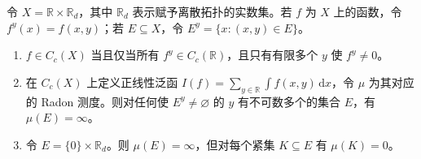 \documentclass[../../main.tex]{subfiles}
\begin{document}
\begin{exercise}\label{exercise:ch07-uncountable-lines}
令 $X=\mathbb R\times\mathbb R_d$，其中 $\mathbb R_d$ 表示赋予离散拓扑的实数集。若 $f$ 为 $X$ 上的函数，令 $f^y(x)=f(x,y)$；若 $E\subseteq X$，令 $E^y=\{x:(x,y)\in E\}$。
\begin{enumerate}[label=\alph*.,ref=(\alph*)]
\item\label{item:ch07-lines-cc} $f\in C_c(X)$ 当且仅当所有 $f^y\in C_c(\mathbb R)$，且只有有限多个 $y$ 使 $f^y\ne0$。
\item\label{item:ch07-lines-infinite-mass} 在 $C_c(X)$ 上定义正线性泛函 $I(f)=\sum_{y\in\mathbb R}\int f(x,y)\,\mathrm dx$，令 $\mu$ 为其对应的 Radon 测度。则对任何使 $E^y\ne\varnothing$ 的 $y$ 有不可数多个的集合 $E$，有 $\mu(E)=\infty$。
\item\label{item:ch07-lines-failure-inner} 令 $E=\{0\}\times\mathbb R_d$。则 $\mu(E)=\infty$，但对每个紧集 $K\subseteq E$ 有 $\mu(K)=0$。
\end{enumerate}
\end{exercise}
\end{document}
